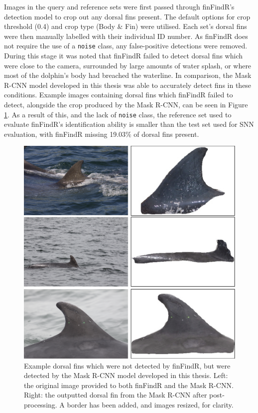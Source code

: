 Images in the query and reference sets were first passed through finFindR's detection model to crop out any dorsal fins present. The default options for crop threshold (0.4) and crop type (Body \& Fin) were utilised. Each set's dorsal fins were then manually labelled with their individual ID number. As finFindR does not require the use of a \texttt{noise} class, any false-positive detections were removed. During this stage it was noted that finFindR failed to detect dorsal fins which were close to the camera, surrounded by large amounts of water splash, or where most of the dolphin's body had breached the waterline. In comparison, the Mask R-CNN model developed in this thesis was able to accurately detect fins in these conditions. Example images containing dorsal fins which finFindR failed to detect, alongside the crop produced by the Mask R-CNN, can be seen in Figure \ref{fig:finFindR-missed-fins-caught-by-mask-r-cnn}. As a result of this, and the lack of \texttt{noise} class, the reference set used to evaluate finFindR's identification ability is smaller than the test set used for SNN evaluation, with finFindR missing 19.03\% of dorsal fins present.

\begin{figure}
	\begin{center}
		\includegraphics[scale=0.8]{Chapter7/figs/finFindR-missed-fins-caught-by-mask-r-cnn.png}
	\end{center}
	\caption[Example dorsal fins which were not detected by finFindR, but were detected by the Mask R-CNN model developed in this thesis.]{Example dorsal fins which were not detected by finFindR, but were detected by the Mask R-CNN model developed in this thesis. Left: the original image provided to both finFindR and the Mask R-CNN. Right: the outputted dorsal fin from the Mask R-CNN after post-processing. A border has been added, and images resized, for clarity.}
	\label{fig:finFindR-missed-fins-caught-by-mask-r-cnn}
\end{figure}

